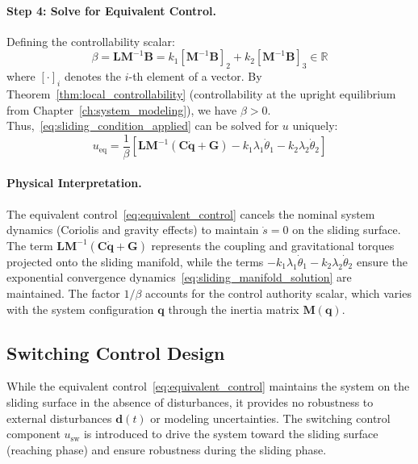 \paragraph{Step 4: Solve for Equivalent Control.}
Defining the controllability scalar:
\begin{equation}
\label{eq:controllability_scalar}
\beta = \mathbf{L}\mathbf{M}^{-1}\mathbf{B} = k_1[\mathbf{M}^{-1}\mathbf{B}]_2 + k_2[\mathbf{M}^{-1}\mathbf{B}]_3 \in \mathbb{R}
\end{equation}
where $[\cdot]_i$ denotes the $i$-th element of a vector. By Theorem~\ref{thm:local_controllability} (controllability at the upright equilibrium from Chapter~\ref{ch:system_modeling}), we have $\beta > 0$. Thus,~\eqref{eq:sliding_condition_applied} can be solved for $u$ uniquely:
\begin{equation}
\label{eq:equivalent_control}
u_{\text{eq}} = \frac{1}{\beta}\left[\mathbf{L}\mathbf{M}^{-1}(\mathbf{C}\dot{\mathbf{q}} + \mathbf{G}) - k_1\lambda_1\dot{\theta}_1 - k_2\lambda_2\dot{\theta}_2\right]
\end{equation}

\paragraph{Physical Interpretation.}
The equivalent control~\eqref{eq:equivalent_control} cancels the nominal system dynamics (Coriolis and gravity effects) to maintain $\dot{s} = 0$ on the sliding surface. The term $\mathbf{L}\mathbf{M}^{-1}(\mathbf{C}\dot{\mathbf{q}} + \mathbf{G})$ represents the coupling and gravitational torques projected onto the sliding manifold, while the terms $-k_1\lambda_1\dot{\theta}_1 - k_2\lambda_2\dot{\theta}_2$ ensure the exponential convergence dynamics~\eqref{eq:sliding_manifold_solution} are maintained. The factor $1/\beta$ accounts for the control authority scalar, which varies with the system configuration $\mathbf{q}$ through the inertia matrix $\mathbf{M}(\mathbf{q})$.

\subsection{Switching Control Design}
\label{subsec:switching_control}

While the equivalent control~\eqref{eq:equivalent_control} maintains the system on the sliding surface in the absence of disturbances, it provides no robustness to external disturbances $\mathbf{d}(t)$ or modeling uncertainties. The switching control component $u_{\text{sw}}$ is introduced to drive the system toward the sliding surface (reaching phase) and ensure robustness during the sliding phase.

